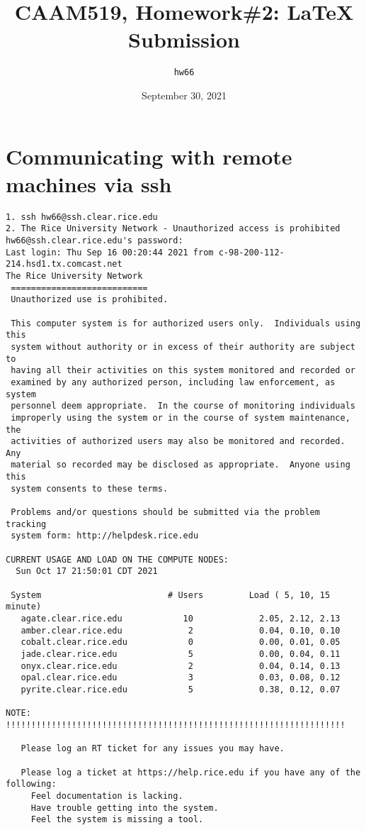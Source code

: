 \documentclass{article}
\title{CAAM519, Homework\#2: \LaTeX\xspace Submission}
\author{\texttt{hw66}}
\date{September 30, 2021}
\begin{document}
\maketitle
\section{Communicating with remote machines via ssh}
\begin{verbatim}
1. ssh hw66@ssh.clear.rice.edu
2. The Rice University Network - Unauthorized access is prohibited
hw66@ssh.clear.rice.edu's password:
Last login: Thu Sep 16 00:20:44 2021 from c-98-200-112-214.hsd1.tx.comcast.net
The Rice University Network
 ===========================
 Unauthorized use is prohibited.

 This computer system is for authorized users only.  Individuals using this
 system without authority or in excess of their authority are subject to
 having all their activities on this system monitored and recorded or
 examined by any authorized person, including law enforcement, as system
 personnel deem appropriate.  In the course of monitoring individuals
 improperly using the system or in the course of system maintenance, the
 activities of authorized users may also be monitored and recorded.  Any
 material so recorded may be disclosed as appropriate.  Anyone using this
 system consents to these terms.

 Problems and/or questions should be submitted via the problem tracking
 system form: http://helpdesk.rice.edu

CURRENT USAGE AND LOAD ON THE COMPUTE NODES:
  Sun Oct 17 21:50:01 CDT 2021

 System                         # Users         Load ( 5, 10, 15 minute)
   agate.clear.rice.edu            10             2.05, 2.12, 2.13
   amber.clear.rice.edu             2             0.04, 0.10, 0.10
   cobalt.clear.rice.edu            0             0.00, 0.01, 0.05
   jade.clear.rice.edu              5             0.00, 0.04, 0.11
   onyx.clear.rice.edu              2             0.04, 0.14, 0.13
   opal.clear.rice.edu              3             0.03, 0.08, 0.12
   pyrite.clear.rice.edu            5             0.38, 0.12, 0.07

NOTE: !!!!!!!!!!!!!!!!!!!!!!!!!!!!!!!!!!!!!!!!!!!!!!!!!!!!!!!!!!!!!!!!!!!

   Please log an RT ticket for any issues you may have.

   Please log a ticket at https://help.rice.edu if you have any of the following:
     Feel documentation is lacking.
     Have trouble getting into the system.
     Feel the system is missing a tool.


\end{verbatim}
\end{document}
